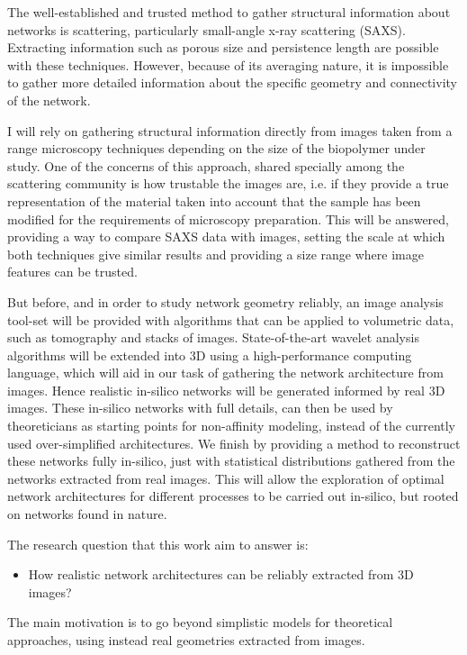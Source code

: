 The well-established and trusted method to gather structural information about networks
is scattering, particularly small-angle x-ray scattering (SAXS). Extracting information such as porous
size and persistence length are possible with these techniques. However, because of its
averaging nature, it is impossible to gather more detailed information about the specific geometry
and connectivity of the network.

I will rely on gathering structural information directly from images taken from a range microscopy techniques depending on the size of the biopolymer under study.
One of the concerns of this approach, shared specially among the scattering community is how trustable the images are, i.e. if they provide a true representation of the material taken into account that the sample has been modified for the requirements of microscopy preparation. This will be answered, providing a way to compare SAXS data with images, setting the scale at which both techniques give similar results and providing a size range where image features can be trusted.

But before, and in order to study network geometry reliably, an image analysis tool-set will be provided with algorithms that can be applied to volumetric data, such as tomography and stacks of images.
State-of-the-art wavelet analysis algorithms will be extended into 3D using a high-performance computing language, which will aid in our task of gathering the network architecture from images.
Hence realistic in-silico networks will be generated informed by real 3D images.
These in-silico networks with full details, can then be used by theoreticians as starting points for non-affinity modeling, instead of the currently used over-simplified architectures.
We finish by providing a method to reconstruct these networks fully in-silico, just with statistical
distributions gathered from the networks extracted from real images. This will allow the exploration of optimal network architectures for different processes to be carried out in-silico, but rooted on networks found in nature.

The research question that this work aim to answer is:
\begin{itemize}
  \item How realistic network architectures can be reliably extracted from 3D images?
\end{itemize}

The main motivation is to go beyond simplistic models for theoretical approaches, using instead real geometries extracted from images.

